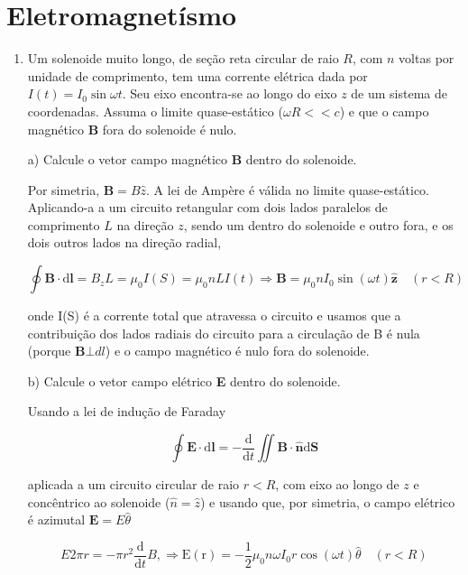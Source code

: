 %
%
\chapter{Eletromagnetísmo}


\begin{enumerate}[start=1,label={\bfseries Q\arabic*.}]



\item Um solenoide muito longo, de seção reta circular de raio $R$, com $n$ voltas por unidade de comprimento, tem uma corrente elétrica dada por $I(t) = I_{0} \sin \omega t$. Seu eixo encontra-se ao longo do eixo $z$ de um sistema de coordenadas. Assuma o limite quase-estático ($\omega R << c$) e que o campo magnético \textbf{B} fora do solenoide é nulo.

a) Calcule o vetor campo magnético \textbf{B} dentro do solenoide.

\resposta

Por simetria, $\mathbf{B} = B\hat{z}$. A lei de Ampère é válida no limite quase-estático. Aplicando-a a um circuito retangular com dois lados paralelos de comprimento $L$ na direção $z$, sendo um dentro do solenoide e outro fora, e os dois outros lados na direção radial,

$$
\oint \mathbf{B} \cdot \mathrm{d} \mathbf{l}=B_{z} L=\mu_{0} I(S)=\mu_{0} n L I(t) \Rightarrow \mathbf{B}=\mu_{0} n I_{0} \sin (\omega t) \hat{\mathbf{z}} \quad(r<R)
$$

onde I(S) é a corrente total que atravessa o circuito e usamos que a contribuição dos lados radiais do circuito para a circulação de B é nula (porque $\mathbf{B}  \bot  dl$) e o campo magnético é nulo fora do solenoide.


b) Calcule o vetor campo elétrico \textbf{E} dentro do solenoide.

\resposta

Usando a lei de indução de Faraday

$$
\oint \mathbf{E} \cdot \mathrm{d} \mathbf{l}=-\frac{\mathrm{d}}{\mathrm{d} t} \iint \mathbf{B} \cdot \hat{\mathbf{n}} \mathrm{d} \mathbf{S}
$$

aplicada a um circuito circular de raio $r < R$, com eixo ao longo de $z$ e concêntrico ao solenoide ($\hat{n} = \hat{z}$) e usando que, por simetria, o campo elétrico é azimutal $\mathbf{E} = E\hat{\theta}$

$$
E 2 \pi r=-\pi r^{2} \frac{\mathrm{d}}{\mathrm{d} t} B, \Rightarrow \mathrm{E}(\mathrm{r})=-\frac{1}{2} \mu_{0} n \omega I_{0} r \cos (\omega t) \hat{\theta} \quad(r<R)
$$




\end{enumerate}
